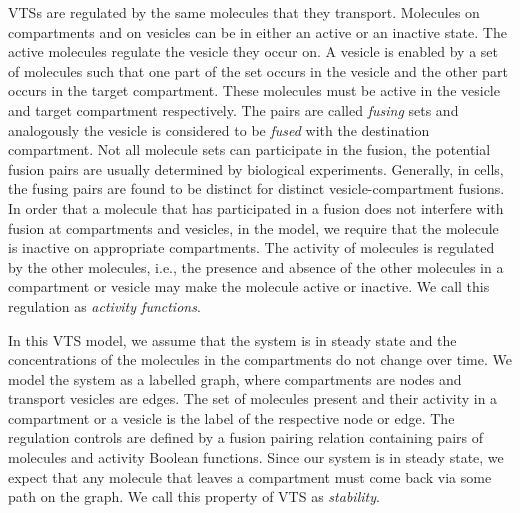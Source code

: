 VTSs are regulated by the same molecules that they transport. Molecules on compartments and on vesicles can be in either an active or an inactive state.
%
%
The active molecules regulate the vesicle they occur on.
%
A vesicle is enabled by a set of molecules
such that one part of the set occurs in the vesicle and the other part
occurs in the target compartment.
%
These molecules must be active in the vesicle
and target compartment respectively.
%
The pairs are called {\em fusing} sets and analogously
the vesicle is considered to be {\em fused} with the
destination compartment.
%
Not all molecule sets can participate in the fusion, the
potential fusion pairs are usually determined by biological experiments.
%
Generally, in cells, the fusing pairs are found to be distinct for distinct vesicle-compartment fusions.
%
In order that a molecule that has participated in a fusion does not interfere
with fusion at compartments and vesicles, in the model, we require that the molecule is inactive on appropriate compartments.
%
%
The activity of molecules is regulated by the other molecules, i.e.,
the presence and absence of the other molecules in a compartment or
vesicle may make the molecule active or inactive.
%
We call this regulation as {\em activity functions}.

%
In this VTS model, we assume that the system is in steady state and the
concentrations of the molecules in the compartments do not change over
time.
%
We model the system as a labelled graph, where compartments are nodes and
transport vesicles are edges.
%
The set of molecules present and their activity in a compartment or
a vesicle is the label of the respective node or edge.
%
The regulation controls are defined by a fusion pairing relation
containing pairs of molecules and activity
Boolean functions.
%
Since our system is in steady state, we expect that any molecule that
leaves a compartment must come back via some path on the graph.
%
We call this property of VTS as {\em stability}.

